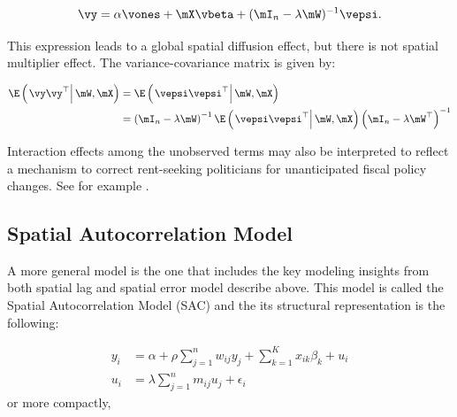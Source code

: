 \documentclass[english,12pt]{book}\usepackage[]{graphicx}\usepackage[]{xcolor}
\begin{document}
\begin{equation}
  \vy =  \alpha \vones + \mX\vbeta + (\mI_n - \lambda\mW)^{-1}\vepsi.
\end{equation}

This expression leads to a global spatial diffusion effect, but there is not spatial multiplier effect. The variance-covariance matrix is given by:

\begin{equation}
  \begin{aligned}
\E\left(\left.\vy\vy^\top\right|\mW, \mX\right)  & = \E\left(\left.\vepsi\vepsi^\top\right|\mW, \mX\right) \\
                 & = \left(\mI_n- \lambda\mW\right)^{-1}\E\left(\left.\vepsi\vepsi^\top\right|\mW, \mX\right)\left(\mI_n- \lambda\mW^\top\right)^{-1}
\end{aligned}
\end{equation}

\begin{remark}
Interaction effects among the unobserved terms may also be interpreted to reflect a mechanism to correct rent-seeking politicians for unanticipated fiscal policy changes. See for example \cite{allers2005tax}.
\end{remark}

\subsection{Spatial Autocorrelation Model}

A more general model is the one that includes the key modeling insights from both spatial lag and spatial error model describe above.  This model is called the Spatial Autocorrelation Model (SAC) and the its structural representation is the following:

\begin{equation*}
  \begin{aligned}
    y_i & = \alpha + \rho    \sum_{j = 1}^n w_{ij} y_j + \sum_{k=1}^K x_{ik}\beta_k + u_i \\
    u_i & = \lambda \sum_{j = 1}^n m_{ij} u_j + \epsilon_i
  \end{aligned}
\end{equation*}
%
or more compactly, 
\end{document}
